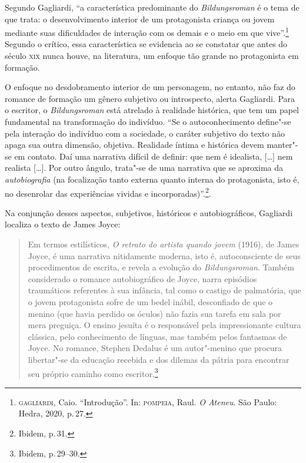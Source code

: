Segundo Gagliardi, ``a característica predominante do
\textit{Bildungsroman} é o tema de que
trata: o desenvolvimento interior de um protagonista criança ou jovem
mediante suas dificuldades de interação com os demais e o meio em que vive''.\footnote{\textsc{gagliardi}, Caio. ``Introdução''. In: \textsc{pompeia}, Raul. \textit{O Ateneu}. São Paulo: Hedra, 2020, p.\,27.} Segundo o crítico, essa característica se evidencia ao se constatar que antes do século \textsc{xix} nunca houve, na literatura, um enfoque tão grande no protagonista em formação.

O enfoque no desdobramento interior de um personagem, no entanto, não faz do romance de formação um gênero subjetivo ou introspecto, alerta Gagliardi. 
Para o escritor, o \textit{Bildungsroman} está atrelado à realidade histórica, que tem um papel fundamental na transformação do indivíduo. ``Se o autoconhecimento define"-se
pela interação do indivíduo com a sociedade, o caráter subjetivo do
texto não apaga sua outra dimensão, objetiva. Realidade íntima e
histórica devem manter"-se em contato. Daí uma narrativa difícil de
definir: que nem é idealista, [\ldots] nem realista [\ldots]. Por outro ângulo, trata"-se de uma narrativa que se aproxima da \textit{autobiografia} (na focalização tanto externa 
quanto interna do protagonista, isto é, no desenrolar das experiências vividas e incorporadas)''.\footnote{Ibidem, p.\,31.}.

Na conjunção desses aspectos, subjetivos, históricos e autobiográficos, Gagliardi localiza o texto de James Joyce:

\begin{quote}
Em termos estilísticos, \textit{O retrato do
artista quando jovem} (1916), de James Joyce, é uma
narrativa nitidamente moderna, isto é, autoconsciente de seus
procedimentos de escrita, e revela a evolução do
\textit{Bildungsroman}. Também considerado o
romance autobiográfico de Joyce, narra episódios traumáticos referentes
à sua infância, tal como o castigo de palmatória, que o jovem
protagonista sofre de um bedel inábil, desconfiado de que o menino (que
havia perdido os óculos) não fazia sua tarefa em sala por mera
preguiça. O ensino jesuíta é o responsável pela impressionante cultura
clássica, pelo conhecimento de línguas, mas também pelos fantasmas de
Joyce. No romance, Stephen Dedalus é um autor"-menino que procura
libertar"-se da educação recebida e dos dilemas da pátria para
encontrar seu próprio caminho como
escritor.\footnote{Ibidem, p.\,29--30.}
\end{quote}

